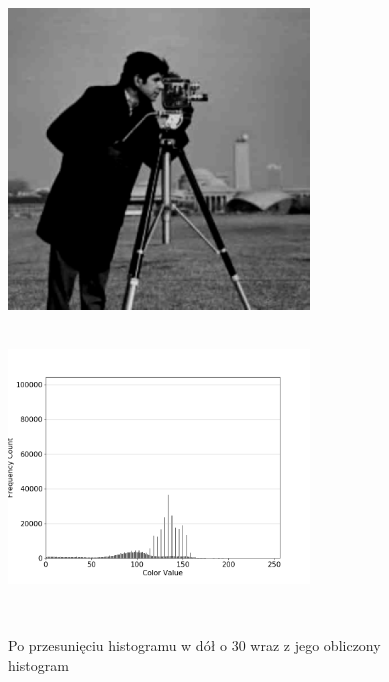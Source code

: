 \documentclass[a4paper,12pt]{book}
\begin{document}
\begin{figure}[H]
	\caption{Po przesunięciu histogramu w dół o 30 wraz z jego obliczony histogram}
	\includegraphics[width=8cm, height=8cm]{5-2/move-histogram-image-photoman--30.png}
	\includegraphics[width=8cm, height=8cm]{5-2/move-histogram-photoman--30.png}
\end{figure}
\end{document}
